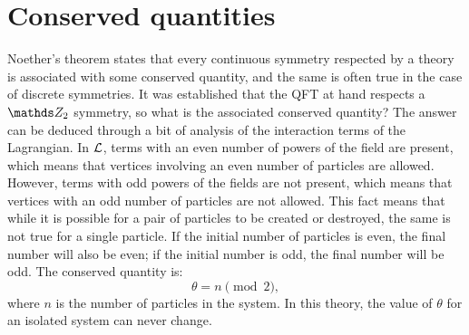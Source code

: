 \section{Conserved quantities}
Noether's theorem \cite{Noether:1918zz} states that every continuous symmetry respected by a theory is associated with some conserved quantity, and the same is often true in the case of discrete symmetries. It was established that the QFT at hand respects a $\ztwo$ symmetry, so what is the associated conserved quantity? The answer can be deduced through a bit of analysis of the interaction terms of the Lagrangian. In $\mathcal{L}$, terms with an even number of powers of the field are present, which means that vertices involving an even number of particles are allowed. However, terms with odd powers of the fields are not present, which means that vertices with an odd number of particles are not allowed. This fact means that while it is possible for a pair of particles to be created or destroyed, the same is not true for a single particle. If the initial number of particles is even, the final number will also be even; if the initial number is odd, the final number will be odd. The conserved quantity is:
\begin{equation}
\theta = n\pmod{2},
\label{eq:theta}
\end{equation}
where $n$ is the number of particles in the system. In this theory, the value of $\theta$ for an isolated system can never change.

